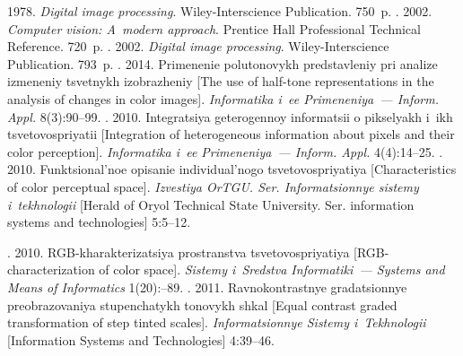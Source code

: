 
  \begin{multicols}{2}

\renewcommand{\bibname}{\protect\rmfamily References}

{\small\frenchspacing
 {%
 \begin{thebibliography}{9}

  
 1978. \textit{Digital image processing}. Wiley-Interscience 
Publication. 750~p.
  . 2002. \textit{Computer vision: A~modern 
approach}. Prentice Hall Professional Technical Reference. 720~p.
. 2002. \textit{Digital image 
processing}. Wiley-Interscience Publication. 793~p.
  . 2014. Primenenie polutonovykh 
predstavleniy pri analize izmeneniy tsvetnykh izobrazheniy [The use of half-tone 
representations in the analysis of changes in color images]. \textit{Informatika i~ee 
Primeneniya~--- Inform. Appl.} 8(3):90--99.
  . 2010. Integratsiya geterogennoy 
informatsii o pikselyakh i~ikh tsvetovospriyatii [Integration of heterogeneous 
information about pixels and their color perception]. \textit{Informatika i~ee 
Primeneniya~--- Inform. Appl.} 4(4):14--25.
  . 2010. Funktsional'noe opisanie 
individual'nogo tsvetovospriyatiya [Characteristics of color perceptual space]. 
\textit{Izvestiya OrTGU. Ser. Informatsionnye sistemy i~tekhnologii} [Herald
of Oryol Technical State University. Ser. 
information systems and technologies] 5:5--12.

\pagebreak

  . 2010. RGB-kharakterizatsiya 
prostranstva tsvetovospriyatiya [RGB-characterization of color space]. 
\textit{Sistemy i~Sredstva Informatiki~--- Systems and Means of Informatics} 
1(20):--89.
  . 2011. Ravnokontrastnye 
gradatsionnye preobrazovaniya stupenchatykh tonovykh shkal [Equal contrast 
graded transformation of step tinted scales]. \textit{Informatsionnye Sistemy 
i~Tekhnologii} [Information Systems and Technologies] 4:39--46.
\end{thebibliography}

 }
 }

\end{multicols}

